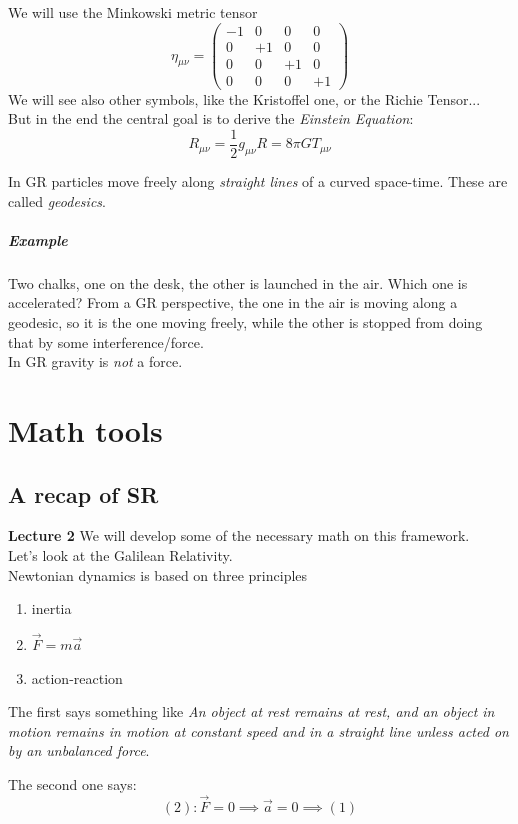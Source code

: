 \documentclass{report}
\begin{document}
We will use the Minkowski metric tensor 
\begin{equation}
	\eta_{\mu\nu} =
	\begin{pmatrix}
		-1 & 0 & 0 & 0 \\
		0 & +1 & 0 & 0 \\
		0 & 0 & +1 & 0 \\
		0 & 0 & 0 & +1 
	\end{pmatrix}
\end{equation}
 We will see also other symbols, like the Kristoffel one, or the Richie Tensor... \\
 But in the end the central goal is to derive the \emph{Einstein Equation}:
\begin{equation}
R_{\mu\nu} = \frac{1}{2} g_{\mu\nu}R = 8\pi G T_{\mu\nu}
\end{equation}

In GR particles move freely along \emph{straight lines} of a curved space-time. These are called \emph{geodesics}.

\paragraph{Example}
Two chalks, one on the desk, the other is launched in the air. Which one is accelerated?
From a GR perspective, the one in the air is moving along a geodesic, so it is the one moving freely, while the other is stopped from doing that by some interference/force. \\
In GR gravity is \emph{not} a force. 

\chapter{Math tools}
\section{A recap of SR}
\textbf{Lecture 2}
We will develop some of the necessary math on this framework. \\
Let's look at the Galilean Relativity. \\
Newtonian dynamics is based on three principles
\begin{enumerate}
	\item inertia
	\item $\vec{F} = m \vec{a}$
	\item action-reaction
\end{enumerate}
The first says something like \emph{An object at rest remains at rest, and an object in motion remains in motion at constant speed and in a straight line unless acted on by an unbalanced force}. \par
The second one says:
\[
	(2): \vec{F} = 0 \implies \vec{a} = 0 \implies (1)
\]
\end{document}
